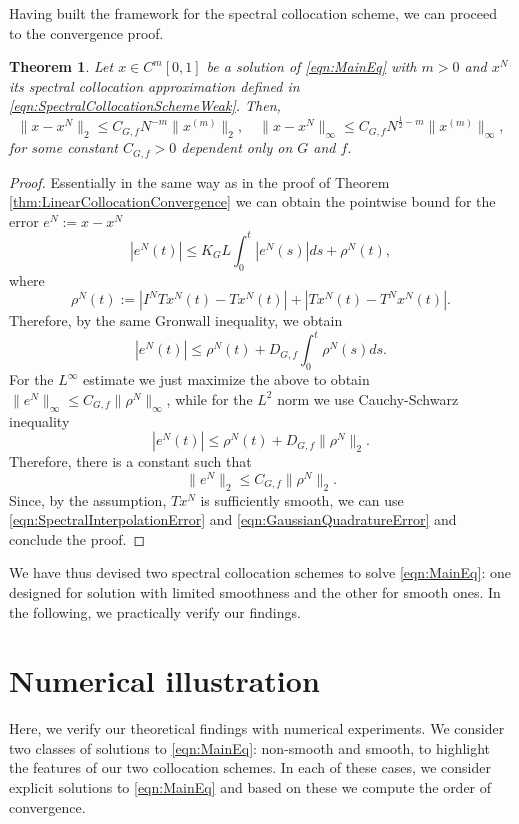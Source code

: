 \documentclass[12pt,a4paper]{article}
\newtheorem{thm}{Theorem}
\begin{document}
Having built the framework for the spectral collocation scheme, we can proceed to the convergence proof.
\begin{thm}\label{thm:SpectralCollocationScheme}
	Let $x \in C^m[0,1]$ be a solution of \eqref{eqn:MainEq} with $m > 0$ and $x^N$ its spectral collocation approximation defined in \eqref{eqn:SpectralCollocationSchemeWeak}. Then,
	\begin{equation}
		\|x-x^N\|_2 \leq C_{G,f} N^{-m} \|x^{(m)}\|_2, \quad \|x-x^N\|_\infty \leq C_{G,f} N^{\frac{1}{2}-m} \|x^{(m)}\|_\infty, 
	\end{equation}
	for some constant $C_{G,f}> 0$ dependent only on $G$ and $f$. 
\end{thm}
\begin{proof}
	Essentially in the same way as in the proof of Theorem \ref{thm:LinearCollocationConvergence} we can obtain the pointwise bound for the error $e^N := x - x^N$
	\begin{equation}
		|e^N(t)| \leq K_G L \int_0^t |e^N(s)| ds + \rho^N(t),
	\end{equation}
	where 
	\begin{equation}
		\rho^N(t) := |I^N Tx^N(t) - Tx^N(t)| + |T x^N(t)-T^N x^N(t)|.
	\end{equation}
	Therefore, by the same Gronwall inequality, we obtain
	\begin{equation}
		|e^N(t)| \leq \rho^N(t) + D_{G,f} \int_0^t \rho^N(s) ds. 
	\end{equation}
	For the $L^\infty$ estimate we just maximize the above to obtain $\|e^N\|_\infty \leq C_{G,f} \|\rho^N\|_\infty$, while for the $L^2$ norm we use Cauchy-Schwarz inequality
	\begin{equation}
		|e^N(t)| \leq \rho^N(t) + D_{G,f} \|\rho^N\|_2.  
	\end{equation}
	Therefore, there is a constant such that
	\begin{equation}
		\|e^N\|_2 \leq C_{G,f} \|\rho^N\|_2. 
	\end{equation}
	Since, by the assumption, $Tx^N$ is sufficiently smooth, we can use \eqref{eqn:SpectralInterpolationError} and \eqref{eqn:GaussianQuadratureError} and conclude the proof.  
\end{proof}
We have thus devised two spectral collocation schemes to solve \eqref{eqn:MainEq}: one designed for solution with limited smoothness and the other for smooth ones. In the following, we practically verify our findings.  

\section{Numerical illustration}
Here, we verify our theoretical findings with numerical experiments. We consider two classes of solutions to \eqref{eqn:MainEq}: non-smooth and smooth, to highlight the features of our two collocation schemes. In each of these cases, we consider explicit solutions to \eqref{eqn:MainEq} and based on these we compute the order of convergence. 
\end{document}
